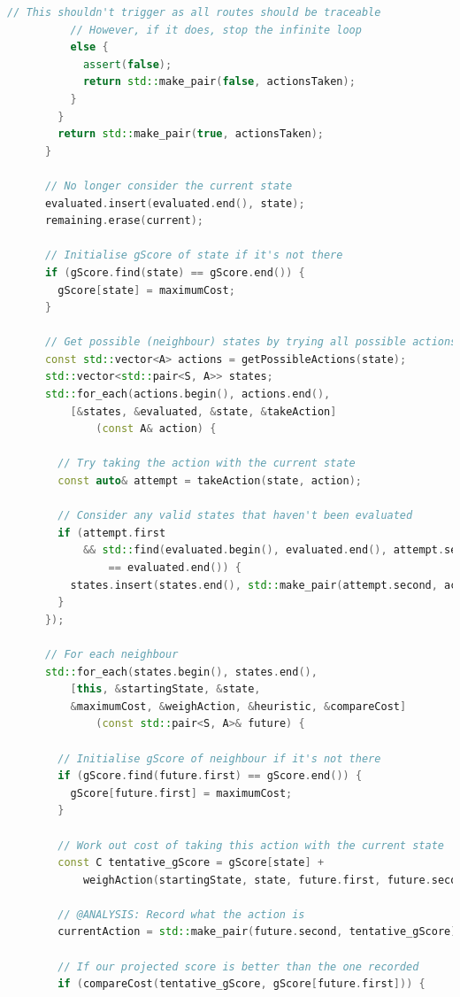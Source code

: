 \documentclass[11pt, a4paper]{report}
\begin{document}
\begin{appendices}
\begin{lstlisting}[language=C++]
          // This shouldn't trigger as all routes should be traceable
          // However, if it does, stop the infinite loop
          else {
            assert(false);
            return std::make_pair(false, actionsTaken);
          }
        }
        return std::make_pair(true, actionsTaken);
      }

      // No longer consider the current state
      evaluated.insert(evaluated.end(), state);
      remaining.erase(current);

      // Initialise gScore of state if it's not there
      if (gScore.find(state) == gScore.end()) {
        gScore[state] = maximumCost;
      }
      
      // Get possible (neighbour) states by trying all possible actions
      const std::vector<A> actions = getPossibleActions(state);
      std::vector<std::pair<S, A>> states;
      std::for_each(actions.begin(), actions.end(),
          [&states, &evaluated, &state, &takeAction] 
              (const A& action) {

        // Try taking the action with the current state
        const auto& attempt = takeAction(state, action);

        // Consider any valid states that haven't been evaluated
        if (attempt.first 
            && std::find(evaluated.begin(), evaluated.end(), attempt.second)
                == evaluated.end()) {
          states.insert(states.end(), std::make_pair(attempt.second, action));
        }
      });

      // For each neighbour
      std::for_each(states.begin(), states.end(),
          [this, &startingState, &state, 
          &maximumCost, &weighAction, &heuristic, &compareCost] 
              (const std::pair<S, A>& future) {

        // Initialise gScore of neighbour if it's not there
        if (gScore.find(future.first) == gScore.end()) {
          gScore[future.first] = maximumCost;
        }

        // Work out cost of taking this action with the current state
        const C tentative_gScore = gScore[state] + 
            weighAction(startingState, state, future.first, future.second);

        // @ANALYSIS: Record what the action is
        currentAction = std::make_pair(future.second, tentative_gScore);

        // If our projected score is better than the one recorded
        if (compareCost(tentative_gScore, gScore[future.first])) {


\end{lstlisting}
\end{appendices}
\end{document}
